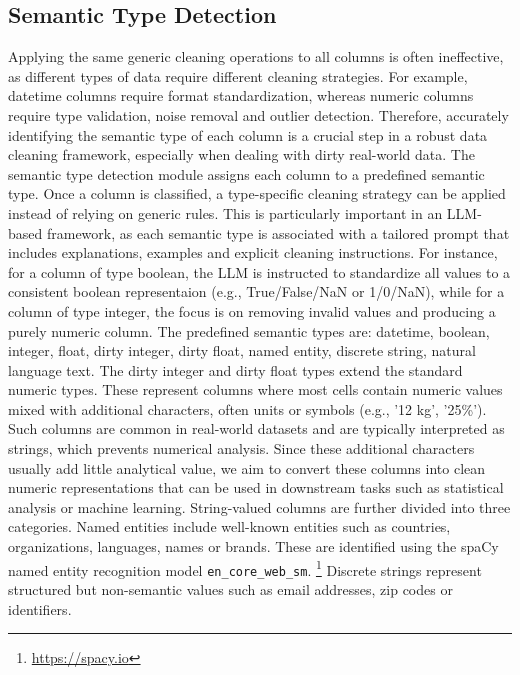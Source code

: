 \subsection{Semantic Type Detection}
Applying the same generic cleaning operations to all columns is often ineffective, as different types of data require different cleaning strategies. 
For example, datetime columns require format standardization, whereas numeric columns require type validation, noise removal and outlier detection. 
Therefore, accurately identifying the semantic type of each column is a crucial step in a robust data cleaning framework, especially when dealing with dirty real-world data.
\newline\newline
The semantic type detection module assigns each column to a predefined semantic type. 
Once a column is classified, a type-specific cleaning strategy can be applied instead of relying on generic rules. 
This is particularly important in an LLM-based framework, as each semantic type is associated with a tailored prompt that includes explanations, examples and explicit cleaning instructions. 
For instance, for a column of type boolean, the LLM is instructed to standardize all values to a consistent boolean representaion (e.g., True/False/NaN or 1/0/NaN), while for a column of type integer, the focus is on removing invalid values and producing a purely numeric column.
The predefined semantic types are: datetime, boolean, integer, float, dirty integer, dirty float, named entity, discrete string, natural language text. 
The dirty integer and dirty float types extend the standard numeric types. 
These represent columns where most cells contain numeric values mixed with additional characters, often units or symbols (e.g., '12 kg', '25\%'). 
Such columns are common in real-world datasets and are typically interpreted as strings, which prevents numerical analysis. 
Since these additional characters usually add little analytical value, we aim to convert these columns into clean numeric representations that can be used in downstream tasks such as statistical analysis or machine learning.
\newline\newline
String-valued columns are further divided into three categories. 
Named entities include well-known entities such as countries, organizations, languages, names or brands. 
These are identified using the spaCy named entity recognition model \texttt{en\_core\_web\_sm}. \footnote{\url{https://spacy.io}}
Discrete strings represent structured but non-semantic values such as email addresses, zip codes or identifiers. 
